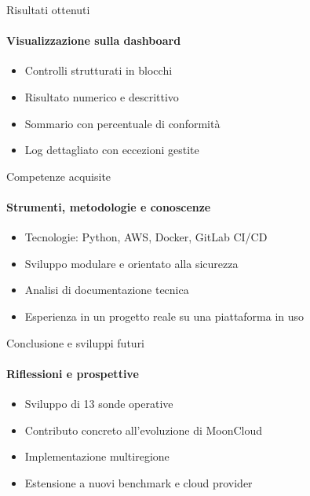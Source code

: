 \documentclass{beamer}
\begin{document}
\begin{frame}{Risultati ottenuti}
    \framesubtitle{Visualizzazione sulla dashboard}
    \begin{itemize}
        \item Controlli strutturati in blocchi
        \item Risultato numerico e descrittivo
        \item Sommario con percentuale di conformità
        \item Log dettagliato con eccezioni gestite
    \end{itemize}
\end{frame}

\begin{frame}{Competenze acquisite}
    \framesubtitle{Strumenti, metodologie e conoscenze}
    \begin{itemize}
        \item Tecnologie: Python, AWS, Docker, GitLab CI/CD
        \item Sviluppo modulare e orientato alla sicurezza
        \item Analisi di documentazione tecnica
        \item Esperienza in un progetto reale su una piattaforma in uso
    \end{itemize}
\end{frame}

\begin{frame}{Conclusione e sviluppi futuri}
    \framesubtitle{Riflessioni e prospettive}
    \begin{itemize}
        \item Sviluppo di 13 sonde operative
        \item Contributo concreto all'evoluzione di MoonCloud
        \vspace{0.5cm}
        \item Implementazione multiregione
        \item Estensione a nuovi benchmark e cloud provider
    \end{itemize}
\end{frame}



\backmatter
\end{document}
